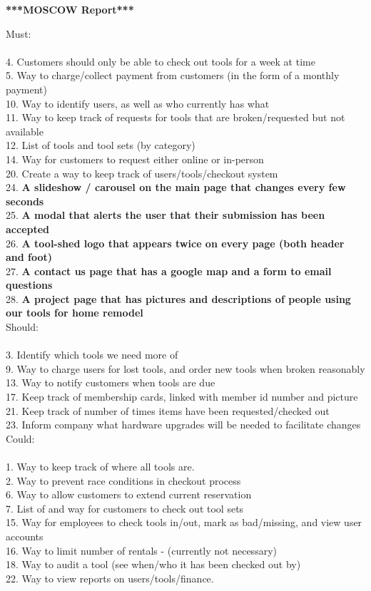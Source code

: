 \documentclass[12pt,letterpaper]{article}
\begin{document}
\newpage
\textbf{***MOSCOW Report***}

Must:\\\\
4. Customers should only be able to check out tools for a week at time\\
5. Way to charge/collect payment from customers (in the form of a monthly payment)\\
10. Way to identify users, as well as who currently has what\\
11. Way to keep track of requests for tools that are broken/requested but not available\\
12. List of tools and tool sets (by category)\\
14. Way for customers to request either online or in-person\\
20. Create a way to keep track of users/tools/checkout system\\
24. \textbf{A slideshow / carousel on the main page that changes every few seconds}\\
25. \textbf{A modal that alerts the user that their submission has been accepted}\\
26. \textbf{A tool-shed logo that appears twice on every page (both header and foot)}\\
27. \textbf{A contact us page that has a google map and a form to email questions}\\
28. \textbf{A project page that has pictures and descriptions of people using our tools for home remodel }\\

Should:\\\\
3. Identify which tools we need more of\\
9. Way to charge users for lost tools, and order new tools when broken reasonably\\
13. Way to notify customers when tools are due\\
17. Keep track of membership cards, linked with member id number and picture\\
21. Keep track of number of times items have been requested/checked out\\
23. Inform company what hardware upgrades will be needed to facilitate changes\\

Could:\\\\
1. Way to keep track of where all tools are.\\
2. Way to prevent race conditions in checkout process\\
6. Way to allow customers to extend current reservation\\
7. List of and way for customers to check out tool sets\\
15. Way for employees to check tools in/out, mark as bad/missing, and view user accounts\\
16. Way to limit number of rentals - (currently not necessary)\\
18. Way to audit a tool (see when/who it has been checked out by)\\
22. Way to view reports on users/tools/finance.\\
\end{document}
